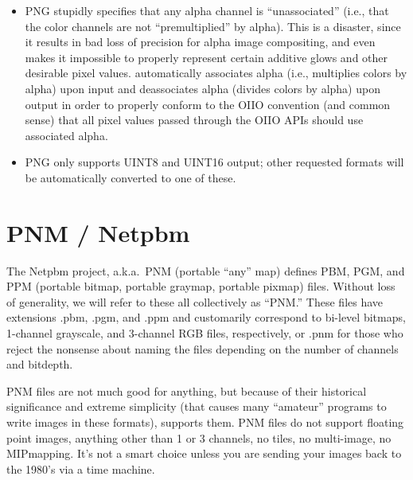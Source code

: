 \begin{itemize}
\item PNG stupidly specifies that any alpha channel is ``unassociated''
  (i.e., that the color channels are not ``premultiplied'' by alpha).
  This is a disaster, since it results in bad loss of precision for
  alpha image compositing, and even makes it impossible to properly
  represent certain additive glows and other desirable pixel values.
  \product automatically associates alpha (i.e., multiplies colors by
  alpha) upon input and deassociates alpha (divides colors by alpha)
  upon output in order to properly conform to the OIIO convention (and
  common sense) that all pixel values passed through the OIIO APIs
  should use associated alpha.
\item PNG only supports UINT8 and UINT16 output; other requested formats
  will be automatically converted to one of these.
\end{itemize}


\vspace{.25in}

\section{PNM / Netpbm}
\label{sec:bundledplugins:pnm}

The Netpbm project, a.k.a.\ PNM (portable ``any'' map) defines PBM, PGM,
and PPM (portable bitmap, portable graymap, portable pixmap) files.
Without loss of generality, we will refer to these all collectively as
``PNM.''  These files have extensions {\cf .pbm}, {\cf .pgm}, and 
{\cf .ppm} and customarily correspond to bi-level bitmaps, 1-channel
grayscale, and 3-channel RGB files, respectively, or {\cf .pnm} for
those who reject the nonsense about naming the files depending on the
number of channels and bitdepth.

PNM files are not much good for anything, but because of their
historical significance and extreme simplicity (that causes many
``amateur'' programs to write images in these formats), \product
supports them.  PNM files do not support floating point images, anything
other than 1 or 3 channels, no tiles, no multi-image, no MIPmapping.
It's not a smart choice unless you are sending your images back to the
1980's via a time machine.

\vspace{.125in}

